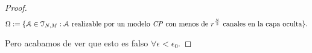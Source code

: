\begin{proof}
    \begin{equation}
        \Omega := \{ \mathcal{A} \in \mathcal{T}_{N, M}: \mathcal{A} \text{ realizable por un modelo \textit{CP} con menos de } r^{\frac{N}{2}} \text{ canales en la capa oculta} \}.
    \end{equation}

    Pero acabamos de ver que esto es falso $\forall \epsilon < \epsilon_0$.
\end{proof}
